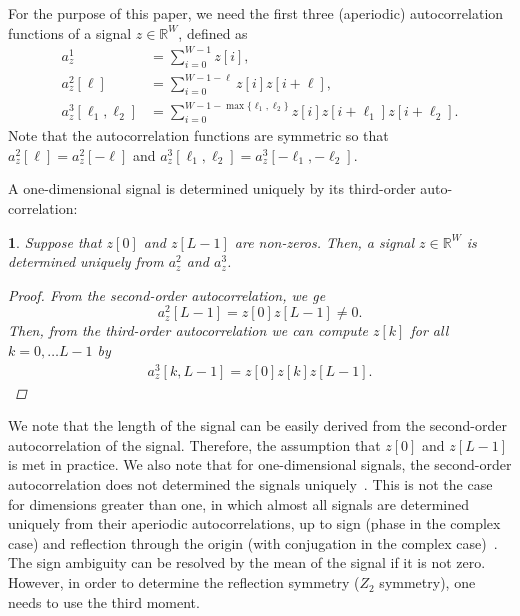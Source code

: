 \documentclass[english,11pt]{article}
\numberwithin{equation}{section}
\theoremstyle{plain}
\theoremstyle{definition}
\theoremstyle{remark}
\theoremstyle{plain}
\theoremstyle{remark}
\theoremstyle{plain}
\theoremstyle{plain}
\newtheorem{proposition}[thm]{\protect\propositionname}
\providecommand{\propositionname}{Proposition}
\begin{document}
For the purpose of this paper, we need the first three (aperiodic) autocorrelation functions of a signal $z\in\mathbb{R}^W$, defined as
\begin{align} \label{eq:autocorrelations}
a_z^1 &= \sum_{i=0}^{W-1} z[i], \nonumber\\
a_z^2[\ell] &= \sum_{i=0}^{W-1-\ell} z[i]z[i+\ell], \nonumber\\
a_z^3[\ell_1,\ell_2] &= \sum_{i=0}^{W-1-\max\{\ell_1,\ell_2\}} z[i]z[i+\ell_1]z[i+\ell_2]. 
\end{align}
Note that the autocorrelation functions are symmetric so that $a_z^2[\ell] = a_z^2[-\ell]$ and $a_z^3[\ell_1,\ell_2] = a_z^3[-\ell_1,-\ell_2]$. 

A one-dimensional signal is determined uniquely by its third-order auto-correlation:
\begin{proposition}
	Suppose that $z[0]$ and $z[L-1]$ are non-zeros. Then, a signal $z\in\mathbb{R}^W$ is determined uniquely from  $a_z^2$ and $a_z^3$.
	\begin{proof}
		From the second-order autocorrelation, we ge
		\begin{equation*}
		a_z^2[L-1] = z[0]z[L-1]\neq 0.
		\end{equation*}
		Then, from the third-order autocorrelation we can compute $z[k]$ for all $k=0,\ldots L-1$ by
		\begin{eqnarray}
		a_z^3[k,L-1] = z[0]z[k]z[L-1].
		\end{eqnarray}
	\end{proof}
\end{proposition}
We note that the length of the signal can be easily derived from the second-order autocorrelation of the signal. Therefore, the assumption that $z[0]$ and $z[L-1]$ is met in practice. We also note that for one-dimensional signals, the second-order autocorrelation does not determined the signals uniquely~\cite{beinert2015ambiguities,bendory2017fourier}. This is not the case for dimensions greater than one, in which almost all signals are determined uniquely from their aperiodic autocorrelations, up to sign (phase in the complex case) and reflection through the origin (with conjugation in the complex case)~\cite{hayes1982reconstruction,hayes1982reducible,bendory2017fourier}. The sign ambiguity can be resolved by the mean of the signal if it is not zero. However,  in order to determine the reflection symmetry ($Z_2$ symmetry), one needs to use the third moment.
\end{document}
